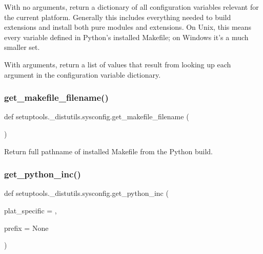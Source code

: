 \begin{DoxyVerb}With no arguments, return a dictionary of all configuration
variables relevant for the current platform.  Generally this includes
everything needed to build extensions and install both pure modules and
extensions.  On Unix, this means every variable defined in Python's
installed Makefile; on Windows it's a much smaller set.

With arguments, return a list of values that result from looking up
each argument in the configuration variable dictionary.
\end{DoxyVerb}
 \mbox{\label{namespacesetuptools_1_1__distutils_1_1sysconfig_a54f9461ef3ea72829409f22730b1b57c}} 
\subsubsection{\texorpdfstring{get\+\_\+makefile\+\_\+filename()}{get\_makefile\_filename()}}
{\footnotesize\ttfamily def setuptools.\+\_\+distutils.\+sysconfig.\+get\+\_\+makefile\+\_\+filename (\begin{DoxyParamCaption}{ }\end{DoxyParamCaption})}

\begin{DoxyVerb}Return full pathname of installed Makefile from the Python build.\end{DoxyVerb}
 \mbox{\label{namespacesetuptools_1_1__distutils_1_1sysconfig_a3c7b105160c06122eca6182428eecb3b}} 
\subsubsection{\texorpdfstring{get\+\_\+python\+\_\+inc()}{get\_python\_inc()}}
{\footnotesize\ttfamily def setuptools.\+\_\+distutils.\+sysconfig.\+get\+\_\+python\+\_\+inc (\begin{DoxyParamCaption}\item[{}]{plat\+\_\+specific = {},  }\item[{}]{prefix = {\ttfamily None} }\end{DoxyParamCaption})}

